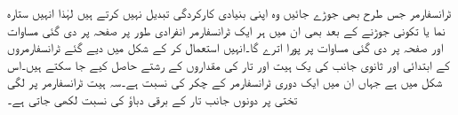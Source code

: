 ٹرانسفارمر جس طرح بھی جوڑے جائیں وہ اپنی بنیادی کارکردگی تبدیل نہیں کرتے ہیں لہٰذا انہیں ستارہ نما یا تکونی جوڑنے کے بعد بھی ان میں ہر ایک ٹرانسفارمر انفرادی طور پر صفحہ  پر  دی گئی مساوات   اور صفحہ  پر دی گئی  مساوات   پر پورا اترے گا۔انہیں استعمال کر کے شکل   میں دیے گئے ٹرانسفارمروں کے ابتدائی اور ثانوی جانب کی یک ہیت اور تار کی مقداروں کے رشتے حاصل کیے جا سکتے ہیں۔اس شکل میں  ہے جہاں   ان میں ایک دوری ٹرانسفارمر کے چکر کی نسبت  ہے۔سہ ہیت ٹرانسفارمر پر لگی تختی پر دونوں جانب تار کے برقی دباؤ کی نسبت  لکھی جاتی ہے۔
\begin{figure}
\centering
\end{figure}
